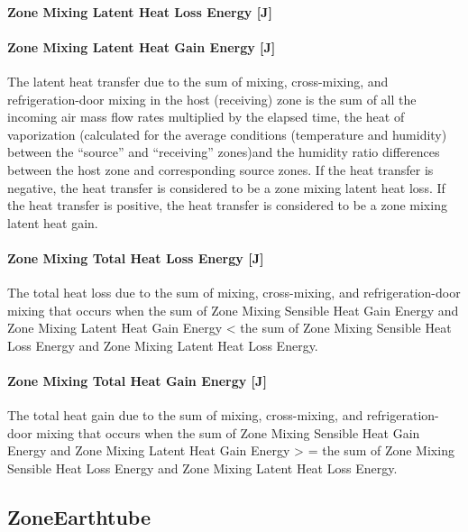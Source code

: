 \paragraph{Zone Mixing Latent Heat Loss Energy {[}J{]}}\label{zone-mixing-latent-heat-loss-energy-j-2}

\paragraph{Zone Mixing Latent Heat Gain Energy {[}J{]}}\label{zone-mixing-latent-heat-gain-energy-j-2}

The latent heat transfer due to the sum of mixing, cross-mixing, and refrigeration-door mixing in the host (receiving) zone is the sum of all the incoming air mass flow rates multiplied by the elapsed time, the heat of vaporization (calculated for the average conditions (temperature and humidity) between the ``source'' and ``receiving'' zones)and the humidity ratio differences between the host zone and corresponding source zones. If the heat transfer is negative, the heat transfer is considered to be a zone mixing latent heat loss. If the heat transfer is positive, the heat transfer is considered to be a zone mixing latent heat gain.

\paragraph{Zone Mixing Total Heat Loss Energy {[}J{]}}\label{zone-mixing-total-heat-loss-energy-j-2}

The total heat loss due to the sum of mixing, cross-mixing, and refrigeration-door mixing that occurs when the sum of Zone Mixing Sensible Heat Gain Energy and Zone Mixing Latent Heat Gain Energy \textless{} the sum of Zone Mixing Sensible Heat Loss Energy and Zone Mixing Latent Heat Loss Energy.

\paragraph{Zone Mixing Total Heat Gain Energy {[}J{]}}\label{zone-mixing-total-heat-gain-energy-j-2}

The total heat gain due to the sum of mixing, cross-mixing, and refrigeration-door mixing that occurs when the sum of Zone Mixing Sensible Heat Gain Energy and Zone Mixing Latent Heat Gain Energy \textgreater{} = the sum of Zone Mixing Sensible Heat Loss Energy and Zone Mixing Latent Heat Loss Energy.

\subsection{ZoneEarthtube}\label{zoneearthtube-earth-tube}

